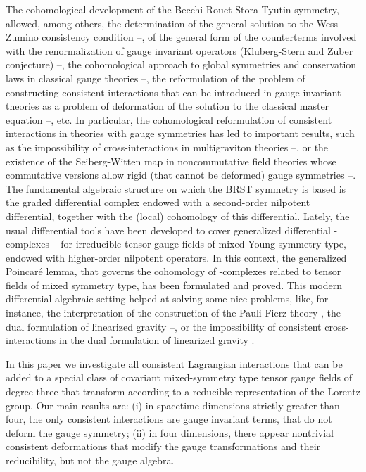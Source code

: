 \documentclass[a4paper,12pt]{article}
\begin{document}
The cohomological development of the Becchi-Rouet-Stora-Tyutin symmetry,
allowed, among others, the determination of the general solution to the
Wess-Zumino consistency condition \cite{1and2}--\cite{10and23}, of the
general form of the counterterms involved with the renormalization of gauge
invariant operators (Kluberg-Stern and Zuber conjecture) \cite{6and23}--\cite
{12and3}, the cohomological approach to global symmetries and conservation
laws in classical gauge theories \cite{13and4}--\cite{16and4}, the
reformulation of the problem of constructing consistent interactions that
can be introduced in gauge invariant theories as a problem of deformation of
the solution to the classical master equation \cite{17and5}--\cite{21and5},
etc. In particular, the cohomological reformulation of consistent
interactions in theories with gauge symmetries has led to important results,
such as the impossibility of cross-interactions in multigraviton theories 
\cite{22and6}--\cite{24and6}, or the existence of the Seiberg-Witten map in
noncommutative field theories whose commutative versions allow rigid (that
cannot be deformed) gauge symmetries \cite{25and7}--\cite{27and7}. The
fundamental algebraic structure on which the BRST symmetry is based is the
graded differential complex endowed with a second-order nilpotent
differential, together with the (local) cohomology of this differential.
Lately, the usual differential tools have been developed to cover
generalized differential \coordHE{}-complexes \cite{28and8}--\cite{29and810} for
irreducible tensor gauge fields of mixed Young symmetry type, endowed with
higher-order nilpotent operators. In this context, the generalized
Poincar\'{e} lemma, that governs the cohomology of \coordHE{}-complexes related to
tensor fields of mixed symmetry type, has been formulated and proved. This
modern differential algebraic setting helped at solving some nice problems,
like, for instance, the interpretation of the construction of the
Pauli-Fierz theory \cite{30and9}, the dual formulation of linearized gravity 
\cite{31and9}--\cite{31and11}, or the impossibility of consistent
cross-interactions in the dual formulation of linearized gravity \cite
{31and11}.

In this paper we investigate all consistent Lagrangian interactions that can
be added to a special class of covariant mixed-symmetry type tensor gauge
fields of degree three that transform according to a reducible
representation of the Lorentz group. Our main results are: (i) in spacetime
dimensions strictly greater than four, the only consistent interactions are
gauge invariant terms, that do not deform the gauge symmetry; (ii) in four
dimensions, there appear nontrivial consistent deformations that modify the
gauge transformations and their reducibility, but not the gauge algebra.
\end{document}
